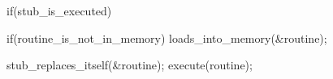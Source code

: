 \documentclass[varwidth=17em,crop]{standalone}
\begin{document}
\begin{ccode}
if(stub_is_executed){

  if(routine_is_not_in_memory)
    loads_into_memory(&routine);

  stub_replaces_itself(&routine);
  execute(routine);
}    
\end{ccode}
\end{document}

